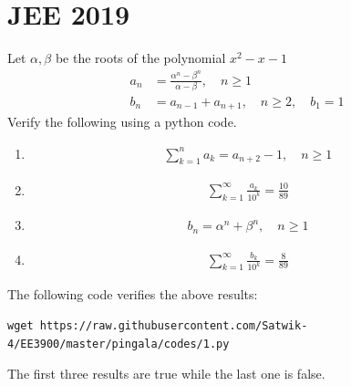 \documentclass[journal,12pt,twocolumn]{IEEEtran}
\renewcommand\thesection{\arabic{section}}
\begin{document}
\section{JEE 2019}
Let $\alpha, \beta$ be the roots of the polynomial $x^2-x-1$\\
\begin{align}
	a_n &= \frac{\alpha^{n}-\beta^{n}}{\alpha - \beta}, \quad n \ge 1
	\\
	b_n &= a_{n-1} + a_{n+1}, \quad n \ge 2, \quad b_1 =1
	\label{eq:10-orig-diff}
\end{align}
Verify the following using a python code.
\begin{enumerate}[label=\thesection.\arabic*
,ref=\thesection.\theenumi]
\item 
\begin{align}
	\sum_{k=1}^{n}a_k = a_{n+2}-1, \quad n \ge 1
\end{align}
 \item 
\begin{align}
	\sum_{k=1}^{\infty}\frac{a_k}{10^k} =\frac{10}{89}
\end{align}
 \item 
\begin{align}
	b_n =\alpha^n + \beta^n, \quad n \ge 1 \label{eq:bn}
\end{align}
 \item 
\begin{align}
	\sum_{k=1}^{\infty}\frac{b_k}{10^k} =\frac{8}{89}
\end{align}
\end{enumerate}
\solution The following code verifies the above results:
	    \begin{lstlisting}
wget https://raw.githubusercontent.com/Satwik-4/EE3900/master/pingala/codes/1.py
\end{lstlisting}
The first three results are true while the last one is false.
\end{document}
